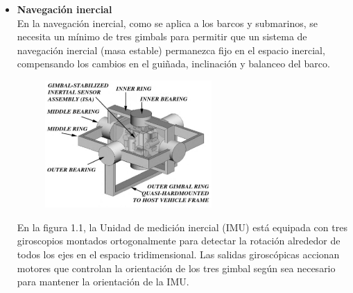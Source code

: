 \begin{itemize}
	\item \textbf{Navegación inercial}\\
	      En la navegación inercial, como se aplica a los barcos y submarinos, se necesita
	      un mínimo de tres gimbals para permitir que un sistema de navegación inercial
	      (masa estable) permanezca fijo en el espacio inercial, compensando los cambios
	      en el guiñada, inclinación y balanceo del barco.
	      \begin{figure}[htb]
		      \centering
		      \includegraphics[width=0.6\textwidth]{Contenido/Cuerpo/Capitulo1/Fig1.eps}
		      \label{fig:Introduccion:Fig2}
	      \end{figure}

	      En la figura 1.1, la Unidad de medición inercial (IMU) está equipada con tres
	      giroscopios montados ortogonalmente para detectar la rotación alrededor de todos
	      los ejes en el espacio tridimensional. Las salidas giroscópicas accionan motores
	      que controlan la orientación de los tres gimbal según sea necesario para mantener
	      la orientación de la IMU.


\end{itemize}
